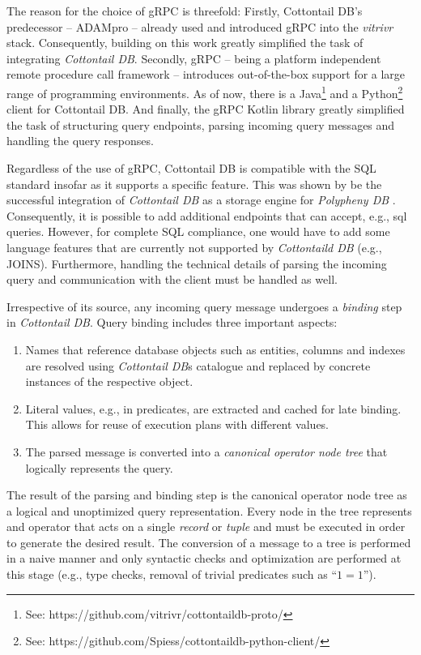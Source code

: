 The reason for the choice of gRPC is threefold: Firstly, Cottontail DB's predecessor -- ADAMpro -- already used and introduced gRPC into the \emph{vitrivr} stack. Consequently, building on this work greatly simplified the task of integrating \emph{Cottontail DB}. Secondly, gRPC -- being a platform independent remote procedure call framework -- introduces out-of-the-box support for a large range of programming environments. As of now, there is a Java\footnote{See: https://github.com/vitrivr/cottontaildb-proto/} and a Python\footnote{See: https://github.com/Spiess/cottontaildb-python-client/} client for Cottontail DB. And finally, the gRPC Kotlin library greatly simplified the task of structuring query endpoints, parsing incoming query messages and handling the query responses.

Regardless of the use of gRPC, Cottontail DB is compatible with the SQL standard insofar as it supports a specific feature. This was shown by be the successful integration of \emph{Cottontail DB} as a storage engine for \emph{Polypheny DB} . Consequently, it is possible to add additional endpoints that can accept, e.g., \acrshort{sql} queries. However, for complete SQL compliance, one would have to add some language features that are currently not supported by \emph{Cottontaild DB} (e.g., JOINS). Furthermore, handling the technical details of parsing the incoming query and communication with the client must be handled as well.

Irrespective of its source, any incoming query message undergoes a \emph{binding} step in \emph{Cottontail DB}. Query binding includes three important aspects:

\begin{enumerate}
    \item Names that reference database objects such as entities, columns and indexes are resolved using \emph{Cottontail DB}s catalogue and replaced by concrete instances of the respective object.
    \item Literal values, e.g., in predicates, are extracted and cached for late binding. This allows for reuse of execution plans with different values.
    \item The parsed message is converted into a \emph{canonical operator node tree} that logically represents the query.
\end{enumerate}

The result of the parsing and binding step is the canonical operator node tree as a logical and unoptimized query representation.  Every node in the tree represents and operator that acts on a single \emph{record} or \emph{tuple} and must be executed in order to generate the desired result. The conversion of a message to a tree is performed in a naive manner and only syntactic checks and optimization are performed at this stage (e.g., type checks, removal of trivial predicates such as ``$1 = 1$'').

